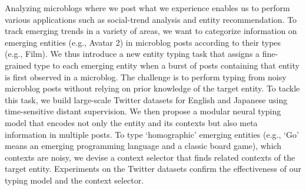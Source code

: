 Analyzing microblogs where we post what we experience enables us to perform various applications such as social-trend analysis and entity recommendation. To track emerging trends in a variety of areas, we want to categorize information on emerging entities (e.g., Avatar 2) in microblog posts according to their types (e.g., Film). We thus introduce a new entity typing task that assigns a fine-grained type to each emerging entity when a burst of posts containing that entity is first observed in a microblog. The challenge is to perform typing from noisy microblog posts without relying on prior knowledge of the target entity. To tackle this task, we build large-scale Twitter datasets for English and Japanese using time-sensitive distant supervision. We then propose a modular neural typing model that encodes not only the entity and its contexts but also meta information in multiple posts. To type `homographic' emerging entities (e.g., `Go' means an emerging programming language and a classic board game), which contexts are noisy, we devise a context selector that finds related contexts of the target entity. Experiments on the Twitter datasets confirm the effectiveness of our typing model and the context selector.
